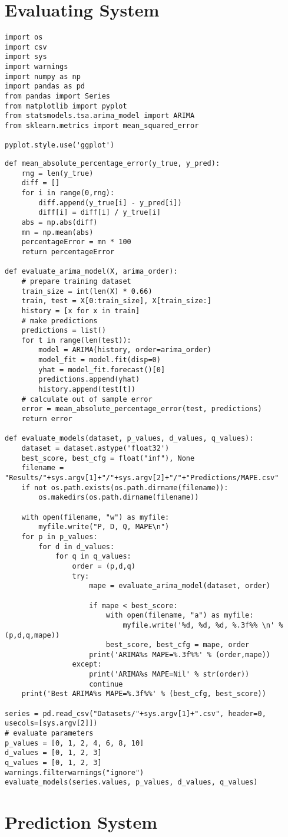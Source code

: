 
\section{Evaluating System}
\begin{lstlisting}
import os
import csv
import sys
import warnings
import numpy as np
import pandas as pd
from pandas import Series
from matplotlib import pyplot
from statsmodels.tsa.arima_model import ARIMA
from sklearn.metrics import mean_squared_error

pyplot.style.use('ggplot')
\end{lstlisting}

\label{Evaluating_System}
\begin{lstlisting}
def mean_absolute_percentage_error(y_true, y_pred): 
	rng = len(y_true)
	diff = []
	for i in range(0,rng):
		diff.append(y_true[i] - y_pred[i])
		diff[i] = diff[i] / y_true[i]
	abs = np.abs(diff)
	mn = np.mean(abs)
	percentageError = mn * 100
	return percentageError
    
def evaluate_arima_model(X, arima_order):
	# prepare training dataset
	train_size = int(len(X) * 0.66)
	train, test = X[0:train_size], X[train_size:]
	history = [x for x in train]
	# make predictions
	predictions = list()
	for t in range(len(test)):
		model = ARIMA(history, order=arima_order)
		model_fit = model.fit(disp=0)
		yhat = model_fit.forecast()[0]
		predictions.append(yhat)
		history.append(test[t])
	# calculate out of sample error
	error = mean_absolute_percentage_error(test, predictions)
	return error

def evaluate_models(dataset, p_values, d_values, q_values):
	dataset = dataset.astype('float32')
	best_score, best_cfg = float("inf"), None
	filename = "Results/"+sys.argv[1]+"/"+sys.argv[2]+"/"+"Predictions/MAPE.csv"
	if not os.path.exists(os.path.dirname(filename)):	
		os.makedirs(os.path.dirname(filename))

	with open(filename, "w") as myfile:
		myfile.write("P, D, Q, MAPE\n")
	for p in p_values:
		for d in d_values:
			for q in q_values:
				order = (p,d,q)
				try:
					mape = evaluate_arima_model(dataset, order)

					if mape < best_score:
						with open(filename, "a") as myfile:
							myfile.write('%d, %d, %d, %.3f%% \n' % (p,d,q,mape))
						best_score, best_cfg = mape, order
					print('ARIMA%s MAPE=%.3f%%' % (order,mape))
				except:
					print('ARIMA%s MAPE=Nil' % str(order))
					continue
	print('Best ARIMA%s MAPE=%.3f%%' % (best_cfg, best_score))

series = pd.read_csv("Datasets/"+sys.argv[1]+".csv", header=0, usecols=[sys.argv[2]])
# evaluate parameters
p_values = [0, 1, 2, 4, 6, 8, 10]
d_values = [0, 1, 2, 3]
q_values = [0, 1, 2, 3]
warnings.filterwarnings("ignore")
evaluate_models(series.values, p_values, d_values, q_values)
\end{lstlisting}

\section{Prediction System}
\label{Prediction_System}
\begin{lstlisting}


\end{lstlisting}
